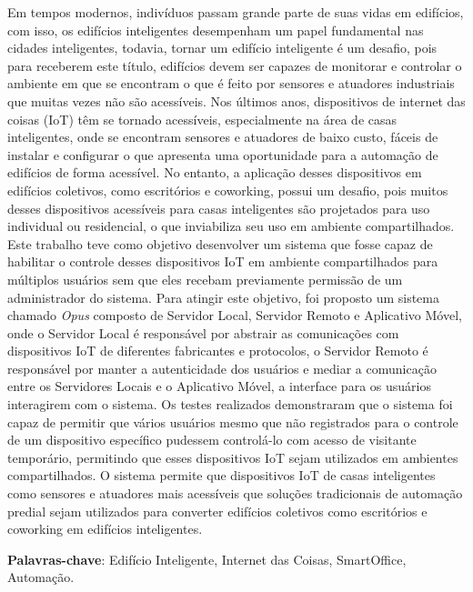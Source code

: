 \begin{resumo}
    Em tempos modernos, indivíduos passam grande parte de suas vidas em edifícios, com isso, os edifícios inteligentes desempenham um papel fundamental
    nas cidades inteligentes, todavia, tornar um edifício inteligente é um desafio, pois para receberem este título, edifícios devem ser capazes de 
    monitorar e controlar o ambiente em que se encontram o que é feito por sensores e atuadores industriais que muitas vezes não são acessíveis.
    Nos últimos anos, dispositivos de internet das coisas (IoT) têm se tornado acessíveis, especialmente na área de casas inteligentes, onde se 
    encontram sensores e atuadores de baixo custo, fáceis de instalar e configurar o que apresenta uma oportunidade para a automação de edifícios
    de forma acessível. No entanto, a aplicação desses dispositivos em edifícios coletivos, como escritórios e coworking, possui um desafio, pois 
    muitos desses dispositivos acessíveis para casas inteligentes são projetados para uso individual ou residencial, o que inviabiliza seu uso em
    ambiente compartilhados.
    Este trabalho teve como objetivo desenvolver um sistema que fosse capaz de habilitar o controle desses dispositivos IoT em ambiente compartilhados
    para múltiplos usuários sem que eles recebam previamente permissão de um administrador do sistema.
    Para atingir este objetivo, foi proposto um sistema chamado \emph{Opus} composto de Servidor Local, Servidor Remoto e Aplicativo Móvel, onde o
    Servidor Local é responsável por abstrair as comunicações com dispositivos IoT de diferentes fabricantes e protocolos, o Servidor Remoto é responsável
    por manter a autenticidade dos usuários e mediar a comunicação entre os Servidores Locais e o Aplicativo Móvel, a interface para os usuários 
    interagirem com o sistema.
    Os testes realizados demonstraram que o sistema foi capaz de permitir que vários usuários mesmo que não registrados para o controle de um dispositivo
    específico pudessem controlá-lo com acesso de visitante temporário, permitindo que esses dispositivos IoT sejam utilizados em ambientes compartilhados.
    O sistema permite que dispositivos IoT de casas inteligentes como sensores e atuadores mais acessíveis que soluções tradicionais de automação predial
    sejam utilizados para converter edifícios coletivos como escritórios e coworking em edifícios inteligentes.

    \vspace{\onelineskip}
    \noindent
    \textbf{Palavras-chave}: Edifício Inteligente, Internet das Coisas, SmartOffice, Automação.
\end{resumo}
    
